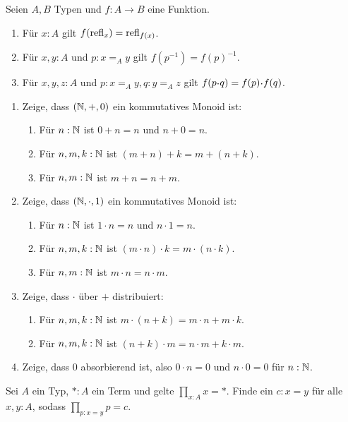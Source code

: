 \documentclass{uebung}
\begin{document}

\begin{exercise}
  Seien $A,B$ Typen und $f:A\to B$ eine Funktion.
  \begin{enumerate}
    \item Für $x:A$ gilt $f(\mathrm{refl}_x)=\mathrm{refl}_{f(x)}$.
    \item Für $x,y:A$ und $p:x=_A y$ gilt $f(p^{-1})=f(p)^{-1}$.
    \item Für $x,y,z:A$ und $p:x=_A y, q:y=_A z$ gilt $f(p\kon q)=f(p)\kon f(q)$.
  \end{enumerate}
\end{exercise}

\begin{exercise}
  \begin{enumerate}
    \item Zeige, dass $(\mathbb{N},+,0)$ ein kommutatives Monoid ist:
      \begin{enumerate}
        \item Für $n:\mathbb{N}$ ist $0 + n = n$ und $n + 0 = n$.
        \item Für $n,m,k:\mathbb{N}$ ist $(m + n) + k = m + (n + k)$.
        \item Für $n,m:\mathbb{N}$ ist $m + n = n + m$.
      \end{enumerate}
    \item Zeige, dass $(\mathbb{N},\cdot,1)$ ein kommutatives Monoid ist:
      \begin{enumerate}
        \item Für $n:\mathbb{N}$ ist $1 \cdot n = n$ und $n \cdot 1 = n$.
        \item Für $n,m,k:\mathbb{N}$ ist $(m \cdot n) \cdot k = m \cdot (n \cdot k)$.
        \item Für $n,m:\mathbb{N}$ ist $m \cdot n = n \cdot m$.
      \end{enumerate}
    \item Zeige, dass $\cdot$ über $+$ distribuiert:
      \begin{enumerate}
        \item Für $n,m,k:\mathbb{N}$ ist $m \cdot (n + k) = m \cdot n + m \cdot k$.
        \item Für $n,m,k:\mathbb{N}$ ist $(n + k) \cdot m = n \cdot m + k \cdot m$.
      \end{enumerate}
    \item Zeige, dass $0$ absorbierend ist, also $0 \cdot n = 0$ und $n \cdot 0 = 0$ für $n:\mathbb{N}$.
  \end{enumerate}
\end{exercise}

\begin{exercise}
  Sei $A$ ein Typ, $\ast:A$ ein Term und gelte $\prod_{x:A}x=\ast$.
  Finde ein $c:x=y$ für alle $x,y:A$, sodass $\prod_{p:x=y}p=c$.
\end{exercise}

\begin{exercise}
\end{exercise}
\end{document}
